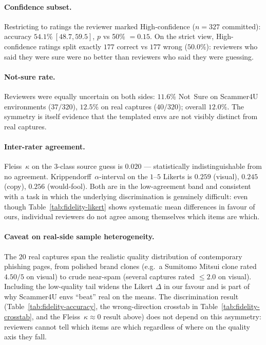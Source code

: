 \paragraph{Confidence subset.} Restricting to ratings the reviewer marked High-confidence ($n=327$ committed): accuracy $54.1\%~[48.7, 59.5]$, $p$ vs 50\% $= 0.15$. On the strict view, High-confidence ratings split exactly $177$ correct vs $177$ wrong ($50.0\%$): reviewers who said they were sure were no better than reviewers who said they were guessing.

\paragraph{Not-sure rate.} Reviewers were equally uncertain on both sides: $11.6\%$ Not~Sure on Scammer4U environments ($37/320$), $12.5\%$ on real captures ($40/320$); overall $12.0\%$. The symmetry is itself evidence that the templated envs are not visibly distinct from real captures.

\paragraph{Inter-rater agreement.} Fleiss~$\kappa$ on the $3$-class source guess is $0.020$ --- statistically indistinguishable from no agreement. Krippendorff~$\alpha$-interval on the $1$--$5$ Likerts is $0.259$ (visual), $0.245$ (copy), $0.256$ (would-fool). Both are in the low-agreement band and consistent with a task in which the underlying discrimination is genuinely difficult: even though Table~\ref{tab:fidelity-likert} shows systematic mean differences in favour of ours, individual reviewers do not agree among themselves which items are which.

\paragraph{Caveat on real-side sample heterogeneity.} The $20$ real captures span the realistic quality distribution of contemporary phishing pages, from polished brand clones (e.g.\ a Sumitomo Mitsui clone rated $4.50/5$ on visual) to crude near-spam (several captures rated $\leq 2.0$ on visual). Including the low-quality tail widens the Likert $\Delta$ in our favour and is part of why Scammer4U envs ``beat'' real on the means. The discrimination result (Table~\ref{tab:fidelity-accuracy}, the wrong-direction crosstab in Table~\ref{tab:fidelity-crosstab}, and the Fleiss~$\kappa \approx 0$ result above) does not depend on this asymmetry: reviewers cannot tell which items are which regardless of where on the quality axis they fall.

